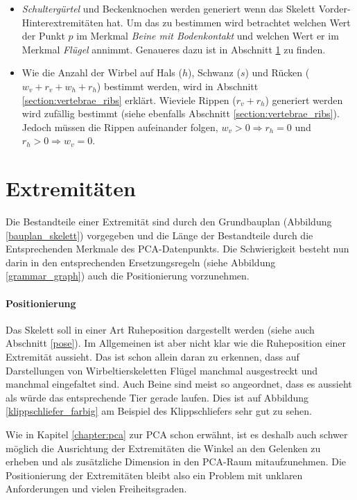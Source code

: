 \begin{itemize}
 \item \emph{Schultergürtel} und Beckenknochen werden generiert wenn das Skelett Vorder- \bzw Hinterextremitäten hat. Um das zu bestimmen wird \ua betrachtet welchen Wert der Punkt $p$ im Merkmal \emph{Beine mit Bodenkontakt} und welchen Wert er im Merkmal \emph{Flügel} annimmt. Genaueres dazu ist in Abschnitt \ref{section:extremity_generation} zu finden.
 
 \item Wie die Anzahl der Wirbel auf Hals ($h$), Schwanz ($s$) und Rücken ($w_v + r_v + w_h + r_h$) bestimmt werden, wird in Abschnitt \ref{section:vertebrae_ribs} erklärt. Wieviele Rippen ($r_v + r_h$) generiert werden wird zufällig bestimmt (siehe ebenfalls Abschnitt \ref{section:vertebrae_ribs}). Jedoch müssen die Rippen aufeinander folgen, \dash $w_v > 0 \Rightarrow r_h = 0$ und $r_h > 0 \Rightarrow w_v = 0$. 
\end{itemize}


\section{Extremitäten}
\label{section:extremity_generation}

Die Bestandteile einer Extremität sind durch den Grundbauplan (Abbildung \ref{bauplan_skelett}) vorgegeben und die Länge der Bestandteile durch die Entsprechenden Merkmale des PCA-Datenpunkts. Die Schwierigkeit besteht nun darin in den entsprechenden Ersetzungsregeln (siehe Abbildung \ref{grammar_graph}) auch die Positionierung vorzunehmen.

\paragraph{Positionierung}
Das Skelett soll in einer Art Ruheposition dargestellt werden (siehe auch Abschnitt \ref{pose}). Im Allgemeinen ist aber nicht klar wie die Ruheposition einer Extremität aussieht. Das ist schon allein daran zu erkennen, dass auf Darstellungen von Wirbeltierskeletten Flügel manchmal ausgestreckt und manchmal eingefaltet sind. Auch Beine sind meist so angeordnet, dass es aussieht als würde das entsprechende Tier gerade laufen. Dies ist auf Abbildung \ref{klippschliefer_farbig} am Beispiel des Klippschliefers sehr gut zu sehen.

Wie in Kapitel \ref{chapter:pca} zur PCA schon erwähnt, ist es deshalb auch schwer möglich die Ausrichtung der Extremitäten \bzw die Winkel an den Gelenken zu erheben und als zusätzliche Dimension in den PCA-Raum mitaufzunehmen.
Die Positionierung der Extremitäten bleibt also ein Problem mit unklaren Anforderungen und vielen Freiheitsgraden.

